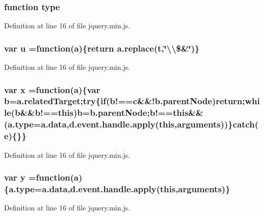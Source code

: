 \subsubsection[{type}]{\setlength{\rightskip}{0pt plus 5cm}function type}\label{jquery_8min_8js_a6561cb5de8e22e2d6cfbe165bf30af12}


Definition at line 16 of file jquery.\-min.\-js.

\subsubsection[{u}]{\setlength{\rightskip}{0pt plus 5cm}var u =function({\bf a})\{return a.\-replace({\bf t},\char`\"{}\textbackslash{}\textbackslash{}\$\&\char`\"{})\}}\label{jquery_8min_8js_accb4ce8dd4113ac0f510653e31809106}


Definition at line 16 of file jquery.\-min.\-js.

\subsubsection[{x}]{\setlength{\rightskip}{0pt plus 5cm}var x =function({\bf a})\{var {\bf b}=a.\-related\-Target;{\bf try}\{{\bf if}(b!==c\&\&!b.\-parent\-Node)return;while({\bf b}\&\&b!==this){\bf b}=b.\-parent\-Node;b!==this\&\&({\bf a.\-type}=a.\-data,d.\-event.\-handle.\-apply(this,arguments))\}catch({\bf e})\{\}\}}\label{jquery_8min_8js_a81e910173af87b1161e719a504d52407}


Definition at line 16 of file jquery.\-min.\-js.

\subsubsection[{y}]{\setlength{\rightskip}{0pt plus 5cm}var y =function({\bf a})\{{\bf a.\-type}=a.\-data,d.\-event.\-handle.\-apply(this,arguments)\}}\label{jquery_8min_8js_a0b31909b1cae9ed1db6ff042057fce60}


Definition at line 16 of file jquery.\-min.\-js.

